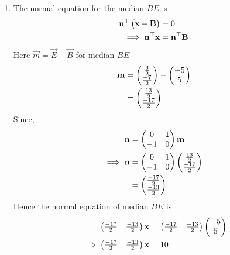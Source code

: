 \documentclass[11pt]{book}
\begin{document}
\begin{enumerate}[label=\thesection.\arabic*.,ref=\thesection.\theenumi]
\begin{enumerate}
\item The normal equation for the median $BE$ is
\begin{align}
\mathbf{n}^{\top}\begin{pmatrix}\mathbf{x}-\mathbf{B}\end{pmatrix}&=0\\
\implies
\mathbf{n}^{\top}\mathbf{x}&=\mathbf{n}^{\top}\mathbf{B}
\end{align}
Here $\vec{m} = \vec{E}- \vec{B}$ for median $BE$
\begin{align}
\mathbf{m}&=\begin{pmatrix}\frac{3}{2}\\ \frac{-7}{2}\end{pmatrix} - \begin{pmatrix}-5\\5\end{pmatrix}\\
       &=\begin{pmatrix}\frac{13}{2}\\ \frac{-17}{2}\end{pmatrix}
\end{align}
Since,
\begin{align}
  \mathbf{n} &= \begin{pmatrix}0 & 1\\
  -1 & 0\end{pmatrix}\mathbf{m}\\
\implies
\mathbf{n} &= \begin{pmatrix}0 & 1\\
  -1 & 0\end{pmatrix}\begin{pmatrix}\frac{13}{2}\\ \frac{-17}{2}\end{pmatrix}\\
        &= \begin{pmatrix}\frac{-17}{2}\\ \frac{-13}{2}\end{pmatrix}
\end{align}
Hence the normal equation of median $BE$ is 
\begin{align}
    \begin{pmatrix}\frac{-17}{2} & \frac{-13}{2}\end{pmatrix}\mathbf{x}&=\begin{pmatrix}\frac{-17}{2} & \frac{-13}{2}\end{pmatrix}\begin{pmatrix}-5\\5\end{pmatrix}\\
\implies
    \begin{pmatrix}\frac{-17}{2} & \frac{-13}{2}\end{pmatrix}\mathbf{x}&=10
\end{align}


\end{enumerate}
\end{enumerate}
\end{document}
